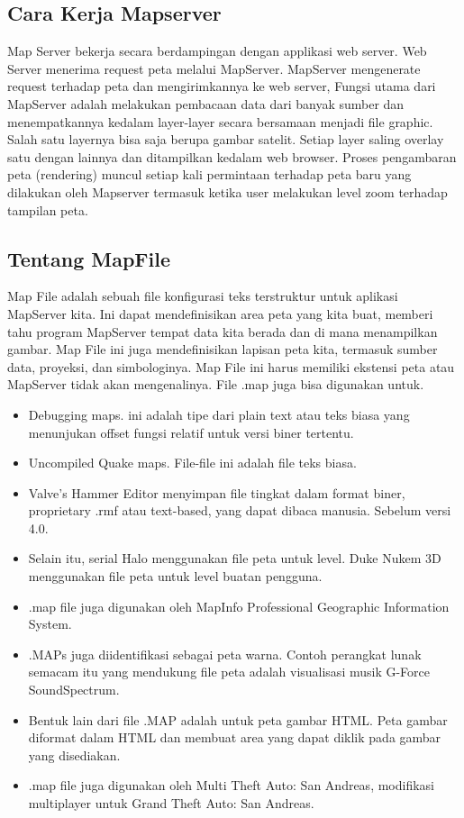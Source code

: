 \subsection{Cara Kerja Mapserver}
Map Server bekerja secara berdampingan dengan applikasi web server. Web Server menerima request peta melalui MapServer. 
MapServer mengenerate request terhadap peta dan mengirimkannya ke web server,
Fungsi utama dari MapServer adalah melakukan pembacaan data dari banyak sumber dan menempatkannya kedalam layer-layer secara bersamaan menjadi file graphic.
Salah satu layernya bisa saja berupa gambar satelit. Setiap layer saling overlay satu dengan lainnya dan ditampilkan kedalam web browser.
Proses pengambaran peta (rendering) muncul setiap kali permintaan terhadap peta baru yang dilakukan oleh Mapserver termasuk ketika user melakukan level zoom terhadap tampilan peta.

\subsection{Tentang MapFile}
Map File adalah sebuah file konfigurasi teks terstruktur untuk aplikasi MapServer kita. Ini dapat mendefinisikan area peta yang kita buat, 
memberi tahu program MapServer tempat data kita berada dan di mana menampilkan gambar. 
Map File ini juga mendefinisikan lapisan peta kita, termasuk sumber data, proyeksi, dan simbologinya. 
Map File ini harus memiliki ekstensi peta atau MapServer tidak akan mengenalinya.
File .map juga bisa digunakan untuk.
\begin{itemize}
	\item Debugging maps. ini adalah tipe dari plain text atau teks biasa yang menunjukan offset fungsi relatif untuk versi biner tertentu.
	\item Uncompiled Quake maps. File-file ini adalah file teks biasa.
	\item Valve's Hammer Editor menyimpan file tingkat dalam format biner, proprietary .rmf atau text-based, yang dapat dibaca manusia. Sebelum versi 4.0.
	\item Selain itu, serial Halo menggunakan file peta untuk level. Duke Nukem 3D menggunakan file peta untuk level buatan pengguna.
	\item .map file juga digunakan oleh MapInfo Professional Geographic Information System.
	\item .MAPs juga diidentifikasi sebagai peta warna. Contoh perangkat lunak semacam itu yang mendukung file peta adalah visualisasi musik G-Force SoundSpectrum.
	\item Bentuk lain dari file .MAP adalah untuk peta gambar HTML. Peta gambar diformat dalam HTML dan membuat area yang dapat diklik pada gambar yang disediakan.
	\item .map file juga digunakan oleh Multi Theft Auto: San Andreas, modifikasi multiplayer untuk Grand Theft Auto: San Andreas.

\end{itemize}


